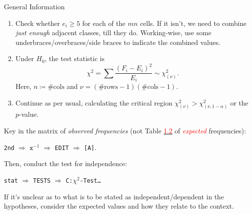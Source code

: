 \documentclass[../Notes.tex]{subfiles}
\begin{document}
\begin{stbox}{General Information}
\begin{enumerate}
\begin{table}[H]
\begin{tabular}{ScSc|Sc|Sc|Sc|Sc|Sc}
      \end{tabular}
      \caption{\emph{Expected} frequencies for a test of independence.}
      \label{table:tests-of-indepedence}
    \end{table}
    \vspace{-1em}
    \begin{minipage}{0.825\textwidth}
      \begin{remark}
        \hypertarget{test-of-independence-expected-frequencies}{}
        The expected frequencies are given by \(e_{ij}=\dfrac{\text{row total}\cdot\text{column total}}{\text{total number of observations}}=\dfrac{t_{r_i}t_{c_j}}{S}\).
      \end{remark}
    \end{minipage}
    \item Check whether \(e_i\geq 5\) for each of the \(mn\) cells. If it isn't, we need to combine \emph{just enough} adjacent classes, till they do. Working-wise, use some underbraces/overbraces/side braces to indicate the combined values. 
    \item Under \(H_0\), the test statistic is
    \[\chi^2=\sum{\frac{(F_i-E_i)^2}{E_i}}\sim\chi_{(\nu)}^2.\]
    Here, \(n\coloneq\#\text{cols}\) and \(\nu=(\#\text{rows}-1)(\#\text{cols}-1)\).
    \item Continue as per usual, calculating the critical region \(\chi_{(\nu)}^2>\chi^2_{(\nu,1-\alpha)}\) or the \(p\)-value.
  \end{enumerate}
\end{stbox}
\begin{GCSkills}{}
  Key in the matrix of \emph{\textcolor{green!70!black}{observed} frequencies} (not Table \hyperlink{table:tests-of-indepedence}{\textcolor{red}{1.2}} of \emph{\textcolor{red}{expected}} frequencies): 
  \begin{center}
    \texttt{2nd} \(\Longrightarrow\) \(\texttt{x}^{-1}\) \(\Longrightarrow\) \texttt{EDIT} \(\Longrightarrow\) \texttt{[A]}.
  \end{center}
  Then, conduct the test for independence:
  \begin{center}
    \texttt{stat} \(\Longrightarrow\) \texttt{TESTS} \(\Longrightarrow\) \texttt{C:\(\chi^2\)-Test\dots}
  \end{center}
\end{GCSkills}
\begin{note}
  If it's unclear as to what is to be stated as independent/dependent in the hypotheses, consider the expected values and how they relate to the context.  
\end{note}
\end{document}
